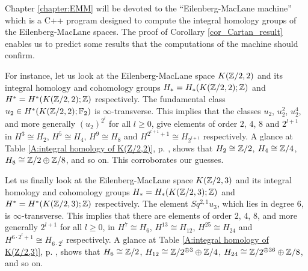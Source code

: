 Chapter \ref{chapter:EMM} will be devoted to the ``Eilenberg-MacLane machine'' which is a C++ program designed to compute the integral homology groups of the Eilenberg-MacLane spaces. The proof of Corollary \ref{cor_Cartan_result} enables us to predict some results that the computations of the machine should confirm. 

For instance, let us look at the Eilenberg-MacLane space $K(\mathbb{Z}/2,2)$ and its integral homology and cohomology groups $H_*=H_*(K(\mathbb{Z}/2,2);\mathbb{Z})$ and $H^*=H^*(K(\mathbb{Z}/2,2);\mathbb{Z})$ respectively. The fundamental class $u_2\in H^*(K(\mathbb{Z}/2,2);\mathbb{F}_2)$ is $\infty$-transverse. This implies that the classes $u_2$, $u_2^2$, $u_2^4$, and more generally $(u_2)^{2^l}$ for all $l\geq0$, give elements of order $2$, $4$, $8$ and $2^{l+1}$ in $H^3\cong H_2$, $H^5\cong H_4$, $H^9\cong H_8$ and $H^{2^{l+1}+1}\cong H_{2^{l+1}}$ respectively. A glance at Table \ref{A:integral homology of K(Z/2,2)}, p. \pageref{A:integral homology of K(Z/2,2)}, shows that $H_2\cong\mathbb{Z}/2$, $H_4\cong\mathbb{Z}/4$, $H_8\cong\mathbb{Z}/2\oplus\mathbb{Z}/8$, and so on. This corroborates our guesses.

Let us finally look at the Eilenberg-MacLane space $K(\mathbb{Z}/2,3)$ and its integral homology and cohomology groups $H_*=H_*(K(\mathbb{Z}/2,3);\mathbb{Z})$ and $H^*=H^*(K(\mathbb{Z}/2,3);\mathbb{Z})$ respectively. The element $Sq^{2,1}u_3$, which lies in degree $6$, is $\infty$-transverse. This implies that there are elements of order $2$, $4$, $8$, and more generally $2^{l+1}$ for all $l\geq0$, in $H^7\cong H_6$, $H^{13}\cong H_{12}$, $H^{25}\cong H_{24}$ and $H^{6\cdot 2^l+1}\cong H_{6\cdot 2^l}$ respectively. A glance at Table \ref{A:integral homology of K(Z/2,3)}, p. \pageref{A:integral homology of K(Z/2,3)}, shows that $H_6\cong\mathbb{Z}/2$, $H_{12}\cong\mathbb{Z}/2^{\oplus3}\oplus\mathbb{Z}/4$, $H_{24}\cong\mathbb{Z}/2^{\oplus36}\oplus\mathbb{Z}/8$, and so on.

\endinput